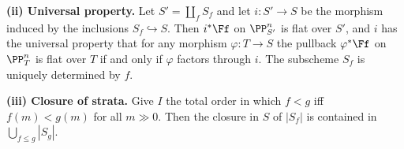 \begin{theorem}
  \textbf{(ii) Universal property.} Let \(S'=\coprod_f S_f\) and let \(i:S'\to S\)
  be the morphism induced by the inclusions \(S_f\hookrightarrow S\). Then
  \(i^*\Ff\) on \(\PP^n_{S'}\) is flat over \(S'\), and \(i\) has the universal
  property that for any morphism \(\varphi:T\to S\) the pullback
  \(\varphi^*\Ff\) on \(\PP^n_T\) is flat over \(T\) if and only if \(\varphi\)
  factors through \(i\). The subscheme \(S_f\) is uniquely determined by \(f\).

  \textbf{(iii) Closure of strata.} Give \(I\) the total order in which \(f<g\)
  iff \(f(m)<g(m)\) for all \(m\gg 0\). Then the closure in \(S\) of \(|S_f|\) is
  contained in \(\bigcup_{f\le g}|S_g|\).
\end{theorem}

